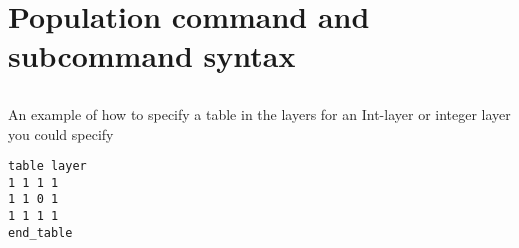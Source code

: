 \section{Population command and subcommand syntax\label{sec:population-syntax}}

\subsection{}
 

\subsection{}
 

\subsection{}
 

\subsection{}
 

\subsection{}


\subsection{}
 

\subsection{}
 

\subsection{}
 

An example of how to specify a table in the layers for an Int-layer or integer layer you could specify

{\small{\begin{verbatim}
table layer
1 1 1 1
1 1 0 1
1 1 1 1
end_table
\end{verbatim}}}


